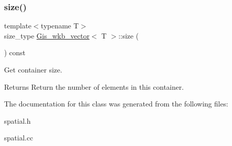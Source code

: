 \subsubsection{\texorpdfstring{size()}{size()}}
{\footnotesize\ttfamily template$<$typename T$>$ \\
size\+\_\+type \mbox{\hyperlink{classGis__wkb__vector}{Gis\+\_\+wkb\+\_\+vector}}$<$ T $>$\+::size (\begin{DoxyParamCaption}{ }\end{DoxyParamCaption}) const\hspace{0.3cm}{\ttfamily [inline]}}



Get container size. 

\begin{DoxyReturn}{Returns}
Return the number of elements in this container. 
\end{DoxyReturn}


The documentation for this class was generated from the following files\+:\begin{DoxyCompactItemize}
\item 
spatial.\+h\item 
spatial.\+cc\end{DoxyCompactItemize}
